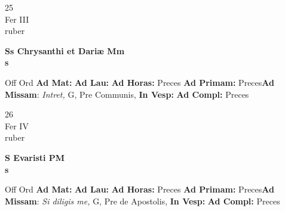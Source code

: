 \documentclass[10pt, openany]{book}
\begin{document}
        \begin{center}
            \begin{minipage}{3.5in}
                \vspace{2em}
                \begin{minipage}{0.5in}
                    {\Huge 25} \\
                    {\normalsize Fer III} \\
                    {\normalsize ruber}
                \end{minipage}
                \begin{minipage}{3.0in}
                    \textbf{ \large Ss Chrysanthi et Dariæ Mm \\
                    \textnormal{\normalsize s}} \\ 
                \end{minipage}
                \begin{justify}Off Ord
                    \textbf{Ad Mat: }
                    \textbf{Ad Lau: }
                    \textbf{Ad Horas: }Preces
                    \textbf{Ad Primam: }Preces\textbf{Ad Missam}: \textit{Intret,} G, Pre Communis,  
                    \textbf{In Vesp: }
                    \textbf{Ad Compl: }Preces
                \end{justify}
            \end{minipage}
        \end{center}
    
        \begin{center}
            \begin{minipage}{3.5in}
                \vspace{2em}
                \begin{minipage}{0.5in}
                    {\Huge 26} \\
                    {\normalsize Fer IV} \\
                    {\normalsize ruber}
                \end{minipage}
                \begin{minipage}{3.0in}
                    \textbf{ \large S Evaristi PM \\
                    \textnormal{\normalsize s}} \\ 
                \end{minipage}
                \begin{justify}Off Ord
                    \textbf{Ad Mat: }
                    \textbf{Ad Lau: }
                    \textbf{Ad Horas: }Preces
                    \textbf{Ad Primam: }Preces\textbf{Ad Missam}: \textit{Si diligis me,} G, Pre de Apostolis,  
                    \textbf{In Vesp: }
                    \textbf{Ad Compl: }Preces
                \end{justify}
            \end{minipage}
        \end{center}
    
\end{document}
